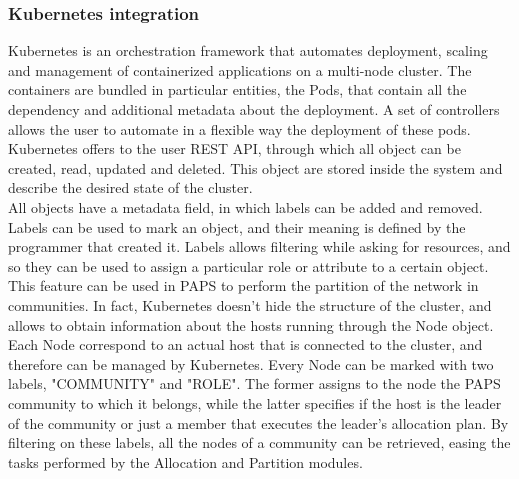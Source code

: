 \subsubsection*{Kubernetes integration}
Kubernetes is an orchestration framework that automates deployment, scaling and management of containerized
applications on a multi-node cluster.
The containers are bundled in particular entities, the Pods, that contain all the dependency and 
additional metadata about the deployment. A set of controllers allows the user to automate
in a flexible way the deployment of these pods.
\\
Kubernetes offers to the user REST API, through which all object can be created, read, updated
and deleted. This object are stored inside the system and describe the desired state of the cluster.
\\
All objects have a metadata field, in which labels can be added and removed.
Labels can be used to mark an object, and their meaning is defined by the programmer that created it.
Labels allows filtering while asking for resources, and so they can be used to assign a particular role 
or attribute to a certain object.
\\
This feature can be used in PAPS to perform the partition of the network in communities.
In fact, Kubernetes doesn't hide the structure of the cluster, and allows to obtain information about
the hosts running through the Node object. Each Node correspond to an actual host that is
connected to the cluster, and therefore can be managed by Kubernetes. 
Every Node can be marked with two labels, "COMMUNITY" and "ROLE". The former assigns to the node 
the PAPS community to which it belongs, while the latter specifies if the host is the leader of the
community or just a member that executes the leader's allocation plan.
By filtering on these labels, all the nodes of a community can be retrieved, easing the tasks performed 
by the Allocation and Partition modules.